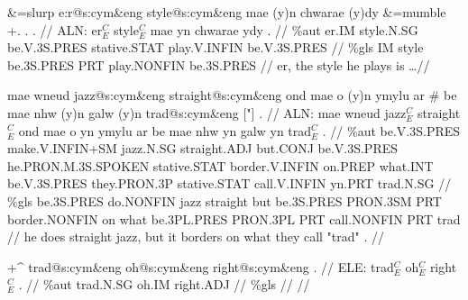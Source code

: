 \documentclass[a4paper,10pt]{article}
\begin{document}
\ex
\begingl[lingstyle=gergl]
\glchat \&=slurp e:r@s:cym\&eng style@s:cym\&eng mae (y)n chwarae (y)dy \&=mumble +. . . //
\glsurface ALN:  er$^{C}_{E}$ style$^{C}_{E}$ mae yn chwarae ydy .  //
\glauto \%aut  er{\scriptsize .IM} style{\scriptsize .N.SG} be{\scriptsize .V.3S.PRES} stative{\scriptsize .STAT} play{\scriptsize .V.INFIN} be{\scriptsize .V.3S.PRES}   //
\glmanual \%gls  IM style be{\scriptsize .3S.PRES} PRT play{\scriptsize .NONFIN} be{\scriptsize .3S.PRES}   //
\gleng er, the style he plays is \dots  //
\endgl
\xe

\ex
\begingl[lingstyle=gergl]
\glchat mae wneud jazz@s:cym\&eng straight@s:cym\&eng ond mae o (y)n ymylu ar \# be mae nhw (y)n galw (y)n trad@s:cym\&eng ["] . //
\glsurface ALN:  mae wneud jazz$^{C}_{E}$ straight$^{C}_{E}$ ond mae o yn ymylu ar be mae nhw yn galw yn trad$^{C}_{E}$ .  //
\glauto \%aut  be{\scriptsize .V.3S.PRES} make{\scriptsize .V.INFIN+SM} jazz{\scriptsize .N.SG} straight{\scriptsize .ADJ} but{\scriptsize .CONJ} be{\scriptsize .V.3S.PRES} he{\scriptsize .PRON.M.3S.SPOKEN} stative{\scriptsize .STAT} border{\scriptsize .V.INFIN} on{\scriptsize .PREP} what{\scriptsize .INT} be{\scriptsize .V.3S.PRES} they{\scriptsize .PRON.3P} stative{\scriptsize .STAT} call{\scriptsize .V.INFIN} yn{\scriptsize .PRT} trad{\scriptsize .N.SG}   //
\glmanual \%gls  be{\scriptsize .3S.PRES} do{\scriptsize .NONFIN} jazz straight but be{\scriptsize .3S.PRES} PRON{\scriptsize .3SM} PRT border{\scriptsize .NONFIN} on what be{\scriptsize .3PL.PRES} PRON{\scriptsize .3PL} PRT call{\scriptsize .NONFIN} PRT trad   //
\gleng he does straight jazz, but it borders on what they call "trad" . //
\endgl
\xe

\ex
\begingl[lingstyle=gergl]
\glchat +^ trad@s:cym\&eng oh@s:cym\&eng right@s:cym\&eng . //
\glsurface ELE:  trad$^{C}_{E}$ oh$^{C}_{E}$ right$^{C}_{E}$ .  //
\glauto \%aut  trad{\scriptsize .N.SG} oh{\scriptsize .IM} right{\scriptsize .ADJ}   //
\glmanual \%gls       //
\gleng  //
\endgl
\xe
\end{document}
